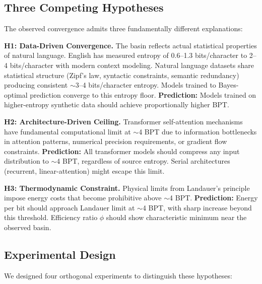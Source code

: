 \documentclass[11pt,a4paper]{article}
\begin{document}
\subsection{Three Competing Hypotheses}

The observed convergence admits three fundamentally different explanations:

\textbf{H1: Data-Driven Convergence.}
The basin reflects actual statistical properties of natural language. English has measured entropy of 0.6--1.3 bits/character \cite{shannon1951} to 2--4 bits/character with modern context modeling. Natural language datasets share statistical structure (Zipf's law, syntactic constraints, semantic redundancy) producing consistent $\sim$3--4 bits/character entropy. Models trained to Bayes-optimal prediction converge to this entropy floor. \textbf{Prediction:} Models trained on higher-entropy synthetic data should achieve proportionally higher BPT.

\textbf{H2: Architecture-Driven Ceiling.}
Transformer self-attention mechanisms have fundamental computational limit at $\sim$4 BPT due to information bottlenecks in attention patterns, numerical precision requirements, or gradient flow constraints. \textbf{Prediction:} All transformer models should compress any input distribution to $\sim$4 BPT, regardless of source entropy. Serial architectures (recurrent, linear-attention) might escape this limit.

\textbf{H3: Thermodynamic Constraint.}
Physical limits from Landauer's principle impose energy costs that become prohibitive above $\sim$4 BPT. \textbf{Prediction:} Energy per bit should approach Landauer limit at $\sim$4 BPT, with sharp increase beyond this threshold. Efficiency ratio $\phi$ should show characteristic minimum near the observed basin.

\subsection{Experimental Design}

We designed four orthogonal experiments to distinguish these hypotheses:
\end{document}
